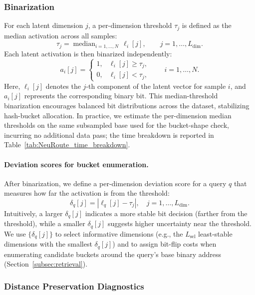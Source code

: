 \documentclass[sigconf, nonacm]{acmart}
\begin{document}
\subsubsection{Binarization}
\label{subsubsec:binarization}

For each latent dimension $j$, a per-dimension threshold $\tau_j$ is defined as the median activation across all samples:
\[
\tau_j = \operatorname{median}_{i=1,\dots,N} \, \ell_i[j], 
\qquad j = 1,\dots,L_{\text{dim}}.
\]
Each latent activation is then binarized independently:
\begin{equation}
\label{equation10}
a_i[j] =
\begin{cases}
1, & \ell_i[j] \ge \tau_j, \\[3pt]
0, & \ell_i[j] < \tau_j,
\end{cases}
\qquad i = 1,\dots,N.
\end{equation}
Here, $\ell_{i}[j]$ denotes the $j$-th component of the latent vector for sample $i$, and $a_i[j]$ represents the corresponding binary bit.
This median-threshold binarization encourages balanced bit distributions across the dataset, stabilizing hash-bucket allocation.
In practice, we estimate the per-dimension median thresholds on the same subsampled base used for the bucket-shape check, incurring no additional data pass; the time breakdown is reported in Table~\ref{tab:NeuRoute_time_breakdown}.

\paragraph{Deviation scores for bucket enumeration.}
After binarization, we define a per-dimension deviation score for a query $q$ that measures how far the activation is from the threshold:
\begin{equation}
\delta_q[j] = \left| \ell_q[j] - \tau_j \right|,\quad j=1,\ldots,L_{\text{dim}}.
\end{equation}
Intuitively, a larger $\delta_q[j]$ indicates a more stable bit decision (farther from the threshold), while a smaller $\delta_q[j]$ suggests higher uncertainty near the threshold. We use $\{\delta_q[j]\}$ to select informative dimensions (e.g., the $L_{\text{sel}}$ least-stable dimensions with the smallest $\delta_q[j]$) and to assign bit-flip costs when enumerating candidate buckets around the query's base binary address (Section~\ref{subsec:retrieval}).




\subsubsection{Distance Preservation Diagnostics}
\end{document}
